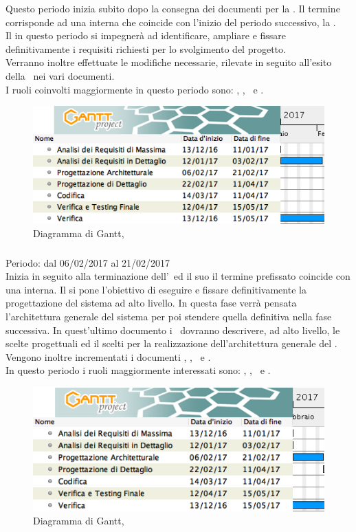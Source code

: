 Questo periodo inizia subito dopo la consegna dei documenti per la \RR. Il termine corrisponde ad una  interna che coincide con l'inizio del periodo successivo, la \PA.\\
Il  in questo periodo si impegnerà ad identificare, ampliare e fissare definitivamente i requisiti richiesti per lo svolgimento del progetto.\\
Verranno inoltre effettuate le modifiche necessarie, rilevate in seguito all'esito della \RR\, nei vari documenti.\\
I ruoli coinvolti maggiormente in questo periodo sono: \An, \Am, \Pm\ e \Ver.

\begin{figure}[H]
	\centering 
	\includegraphics[scale=0.5]{Immagini/Gantt/ARD.png}
	\caption{Diagramma di Gantt, \ARD}
\end{figure}

\subsubsection{\PA}
Periodo: dal 06/02/2017 al 21/02/2017 \\

Inizia in seguito alla terminazione dell'\ARD\ ed il suo il termine prefissato coincide con una  interna.
Il  si pone l'obiettivo di eseguire e fissare definitivamente la progettazione del sistema ad alto livello. In questa fase verrà pensata l'architettura generale del sistema per poi stendere quella definitiva nella fase successiva.
In quest'ultimo documento i \ProgP\ dovranno descrivere, ad alto livello, le scelte progettuali ed il  scelti per la realizzazione dell'architettura generale del . Vengono inoltre incrementati i documenti \NdP, \PdP, \PdQ\ e \Gl.\\
In questo periodo i ruoli maggiormente interessati sono: \Prog, \Pm, \Ver\ e \Am.

 \begin{figure}[H]
	\centering 
	\includegraphics[scale=0.5]{Immagini/Gantt/PA.png}
	\caption{Diagramma di Gantt, \PA}
\end{figure}

